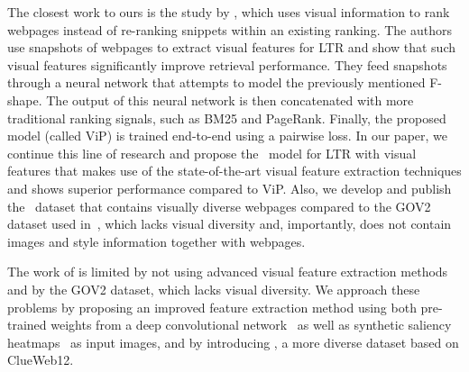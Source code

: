 The closest work to ours is the study by \citet{fan2017learning}, which uses visual information to rank webpages instead of re-ranking snippets within an existing ranking.
The authors use snapshots of webpages to extract visual features for LTR
and show that such visual features significantly improve retrieval performance.
They feed snapshots through a neural network that attempts to model the previously mentioned F-shape.
The output of this neural network is then concatenated with more traditional ranking signals, such as BM25 and PageRank.
Finally, the proposed model (called ViP) is trained end-to-end using a pairwise loss.
In our paper, we continue this line of research and propose the \modelname~model for \ac{LTR} with visual features
that makes use of the state-of-the-art visual feature extraction techniques and shows superior performance compared to ViP.
Also, we develop and publish the \datasetname~dataset that contains visually diverse webpages
compared to the GOV2 dataset used in~\cite{fan2017learning}, which lacks visual diversity and, importantly, does not contain images and style information together with webpages.

The work of \citet{fan2017learning} is limited by not using advanced visual feature extraction methods and by the GOV2 dataset, which lacks visual diversity.
We approach these problems by proposing an improved feature extraction method using both pre-trained weights from a deep convolutional network~\cite{simonyan2014very} as well as synthetic saliency heatmaps~\cite{shan2017two} as input images, and by introducing \datasetname, a more diverse dataset based on ClueWeb12.
\fi






